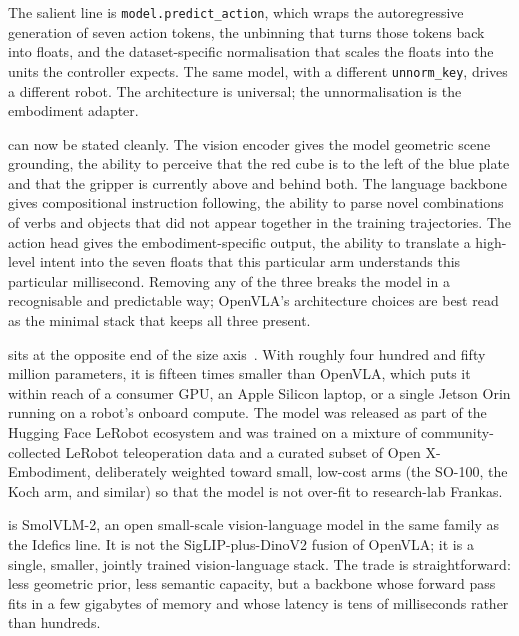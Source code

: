 The salient line is \verb|model.predict_action|, which wraps the autoregressive generation of seven action tokens, the unbinning that turns those tokens back into floats, and the dataset-specific normalisation that scales the floats into the units the controller expects. The same model, with a different \verb|unnorm_key|, drives a different robot. The architecture is universal; the unnormalisation is the embodiment adapter.

 can now be stated cleanly. The vision encoder gives the model geometric scene grounding, the ability to perceive that the red cube is to the left of the blue plate and that the gripper is currently above and behind both. The language backbone gives compositional instruction following, the ability to parse novel combinations of verbs and objects that did not appear together in the training trajectories. The action head gives the embodiment-specific output, the ability to translate a high-level intent into the seven floats that this particular arm understands this particular millisecond. Removing any of the three breaks the model in a recognisable and predictable way; OpenVLA's architecture choices are best read as the minimal stack that keeps all three present.

\vspace{2.5em}

 sits at the opposite end of the size axis~\cite{Shukor2025SmolVLA}. With roughly four hundred and fifty million parameters, it is fifteen times smaller than OpenVLA, which puts it within reach of a consumer GPU, an Apple Silicon laptop, or a single Jetson Orin running on a robot's onboard compute. The model was released as part of the Hugging Face LeRobot ecosystem and was trained on a mixture of community-collected LeRobot teleoperation data and a curated subset of Open X-Embodiment, deliberately weighted toward small, low-cost arms (the SO-100, the Koch arm, and similar) so that the model is not over-fit to research-lab Frankas.


 is SmolVLM-2, an open small-scale vision-language model in the same family as the Idefics line. It is not the SigLIP-plus-DinoV2 fusion of OpenVLA; it is a single, smaller, jointly trained vision-language stack. The trade is straightforward: less geometric prior, less semantic capacity, but a backbone whose forward pass fits in a few gigabytes of memory and whose latency is tens of milliseconds rather than hundreds.

